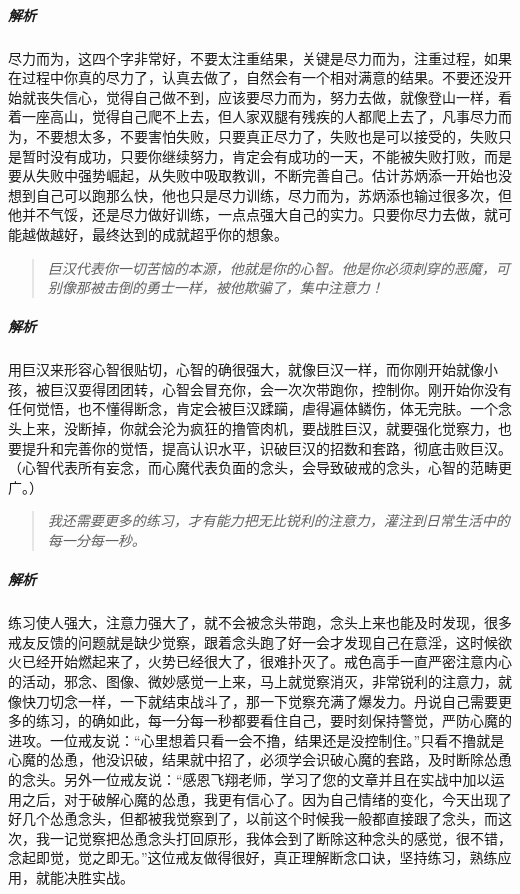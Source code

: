 \subparagraph{解析} 尽力而为，这四个字非常好，不要太注重结果，关键是尽力而为，注重过程，如果在过程中你真的尽力了，认真去做了，自然会有一个相对满意的结果。不要还没开始就丧失信心，觉得自己做不到，应该要尽力而为，努力去做，就像登山一样，看着一座高山，觉得自己爬不上去，但人家双腿有残疾的人都爬上去了，凡事尽力而为，不要想太多，不要害怕失败，只要真正尽力了，失败也是可以接受的，失败只是暂时没有成功，只要你继续努力，肯定会有成功的一天，不能被失败打败，而是要从失败中强势崛起，从失败中吸取教训，不断完善自己。估计苏炳添一开始也没想到自己可以跑那么快，他也只是尽力训练，尽力而为，苏炳添也输过很多次，但他并不气馁，还是尽力做好训练，一点点强大自己的实力。只要你尽力去做，就可能越做越好，最终达到的成就超乎你的想象。

\begin{quote}\it
    巨汉代表你一切苦恼的本源，他就是你的心智。他是你必须刺穿的恶魔，可别像那被击倒的勇士一样，被他欺骗了，集中注意力！
\end{quote}

\subparagraph{解析} 用巨汉来形容心智很贴切，心智的确很强大，就像巨汉一样，而你刚开始就像小孩，被巨汉耍得团团转，心智会冒充你，会一次次带跑你，控制你。刚开始你没有任何觉悟，也不懂得断念，肯定会被巨汉蹂躏，虐得遍体鳞伤，体无完肤。一个念头上来，没断掉，你就会沦为疯狂的撸管肉机，要战胜巨汉，就要强化觉察力，也要提升和完善你的觉悟，提高认识水平，识破巨汉的招数和套路，彻底击败巨汉。（心智代表所有妄念，而心魔代表负面的念头，会导致破戒的念头，心智的范畴更广。）

\begin{quote}\it
    我还需要更多的练习，才有能力把无比锐利的注意力，灌注到日常生活中的每一分每一秒。
\end{quote}

\subparagraph{解析} 练习使人强大，注意力强大了，就不会被念头带跑，念头上来也能及时发现，很多戒友反馈的问题就是缺少觉察，跟着念头跑了好一会才发现自己在意淫，这时候欲火已经开始燃起来了，火势已经很大了，很难扑灭了。戒色高手一直严密注意内心的活动，邪念、图像、微妙感觉一上来，马上就觉察消灭，非常锐利的注意力，就像快刀切念一样，一下就结束战斗了，那一下觉察充满了爆发力。丹说自己需要更多的练习，的确如此，每一分每一秒都要看住自己，要时刻保持警觉，严防心魔的进攻。一位戒友说：“心里想着只看一会不撸，结果还是没控制住。”只看不撸就是心魔的怂恿，他没识破，结果就中招了，必须学会识破心魔的套路，及时断除怂恿的念头。另外一位戒友说：“感恩飞翔老师，学习了您的文章并且在实战中加以运用之后，对于破解心魔的怂恿，我更有信心了。因为自己情绪的变化，今天出现了好几个怂恿念头，但都被我觉察到了，以前这个时候我一般都直接跟了念头，而这次，我一记觉察把怂恿念头打回原形，我体会到了断除这种念头的感觉，很不错，念起即觉，觉之即无。”这位戒友做得很好，真正理解断念口诀，坚持练习，熟练应用，就能决胜实战。


